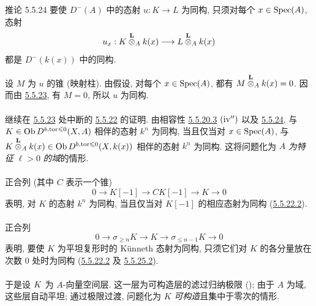\begin{enonce*}{推论 5.5.24}
要使 $D^{-}(A)$ 中的态射 $u:K\rightarrow L$ 为同构, 只须对每个 $x\in \Spec(A)$, 态射
$$
u_{x}:K\overset{\LL}{\otimes}_{A}k(x)\longrightarrow
L\overset{\LL}{\otimes}_{A}k(x)
$$
都是 $D^{-}(k(x))$ 中的同构.
\end{enonce*}

\sisi{\noindent}{}设 $M$ 为 $u$ 的锥 (映射柱). 由假设, 对每个 $x\in\Spec(A)$, 都有 $M\overset{\LL}{\otimes}_{A}k(x)=0$. 因而由 \hyperref[XVII.prop5.5.23]{5.5.23}, 有 $M=0$, 所以 $u$ 为同构.

\setcounter{subsubsection}{25}
\setcounter{paragraph}{0}
\paragraph{}
继续在 \hyperref[XVII.prop5.5.23]{5.5.23} 处中断的 \hyperref[XVII.lem5.5.22]{5.5.22} 的证明. 由相容性 \hyperref[XVII.par5.5.20.3]{5.5.20.3} ${\rm(iv'')}$ 以及 \hyperref[XVII.cor5.5.24]{5.5.24}, 与 $K\in \Ob D^{b,\tor\leq 0}(X,A)$ 相伴的态射 $k^{n}$ 为同构, 当且仅当对 $x\in
\Spec(A)$, 与 $K\overset{\LL}{\otimes}_{A}k(x)\in \Ob
D^{b,\tor\leq 0}(X,k(x))$ 相伴的态射 $k^{n}$ 为同构. 这将问题化为 $A$ \emph{为特征} $\ell > 0$ \emph{的域}的情形.

\paragraph{}
正合列 (其中 $C$ 表示一个锥)
$$
0\longrightarrow K[-1]\longrightarrow CK[-1]\longrightarrow
K\longrightarrow 0
$$
表明, 对 $K$ 的态射 $k^{n}$ 为同构, 当且仅当对 $K[-1]$ 的相应态射为同构 (\hyperref[XVII.lem5.5.22.2]{5.5.22.2}).

\paragraph{}
正合列\pageoriginale
$$
0\longrightarrow \sigma_{\geq n} K\longrightarrow K\longrightarrow
\sigma_{\leq n-1} K\longrightarrow 0
$$
表明, 要使 $K$ 为平坦复形时的 Künneth 态射为同构, 只须它们对 $K$ 的各分量放在次数 $0$ 处时为同构 (\hyperref[XVII.lem5.5.22.2]{5.5.22.2}\sisi{)}{} 及 \sisi{(}{}\hyperref[XVII.par5.5.25.2]{5.5.25.2}).

\paragraph{}
于是设 $\sisi{F}{K}$ 为 $A$-向量空间层. 这一层为可构造层的滤过归纳极限 (); 由于 $A$ 为域, 这些层自动平坦; 通过极限过渡, 问题化为 $K$ \emph{可构造}且集中于零次的情形.

